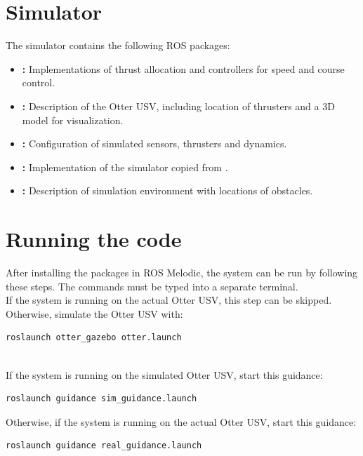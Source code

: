 \section{Simulator}

The simulator contains the following ROS packages:

\begin{itemize}

\item \textbf{:} Implementations of thrust allocation and controllers for speed and course control.

\item \textbf{:} Description of the Otter USV, including location of thrusters and a 3D model for visualization.

\item \textbf{:} Configuration of simulated sensors, thrusters and dynamics.

\item \textbf{:} Implementation of the simulator copied from \citet{website:vrx}.

\item \textbf{:} Description of simulation environment with locations of obstacles.

\end{itemize}

\section{Running the code}

After installing the packages in ROS Melodic, the system can be run by following these steps. The commands must be typed into a separate terminal. \\

\noindent If the system is running on the actual Otter USV, this step can be skipped. Otherwise, simulate the Otter USV with:
\begin{lstlisting}[language=bash]
roslaunch otter_gazebo otter.launch
\end{lstlisting}

\noindent \\ If the system is running on the simulated Otter USV, start this guidance:
\begin{lstlisting}[language=bash]
roslaunch guidance sim_guidance.launch
\end{lstlisting}
\noindent Otherwise, if the system is running on the actual Otter USV, start this guidance:
\begin{lstlisting}[language=bash]
roslaunch guidance real_guidance.launch
\end{lstlisting}

